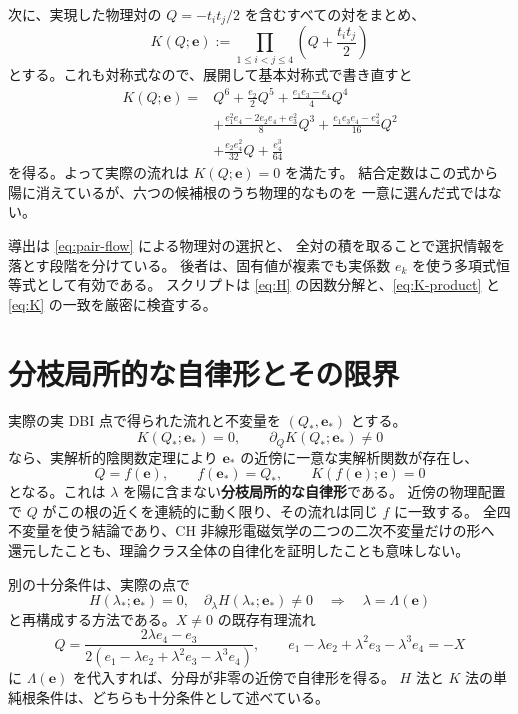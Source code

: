 \documentclass[11pt,a4paper]{article}
\newcommand{\ee}{\boldsymbol e}
\begin{document}
次に、実現した物理対の $Q=-t_it_j/2$ を含むすべての対をまとめ、
\begin{equation}\label{eq:K-product}
K(Q;\ee):=\prod_{1\leq i<j\leq4}\left(Q+\frac{t_it_j}{2}\right)
\end{equation}
とする。これも対称式なので、展開して基本対称式で書き直すと
\begin{equation}\label{eq:K}
\boxed{\begin{aligned}
K(Q;\ee)={}&Q^6+\frac{e_2}{2}Q^5+\frac{e_1e_3-e_4}{4}Q^4\\
&+\frac{e_1^2e_4-2e_2e_4+e_3^2}{8}Q^3
 +\frac{e_1e_3e_4-e_4^2}{16}Q^2\\
&+\frac{e_2e_4^2}{32}Q+\frac{e_4^3}{64}
\end{aligned}}
\end{equation}
を得る。よって実際の流れは $K(Q;\ee)=0$ を満たす。
結合定数はこの式から陽に消えているが、六つの候補根のうち物理的なものを
一意に選んだ式ではない。

導出は \eqref{eq:pair-flow} による物理対の選択と、
全対の積を取ることで選択情報を落とす段階を分けている。
後者は、固有値が複素でも実係数 $e_k$ を使う多項式恒等式として有効である。
スクリプトは \eqref{eq:H} の因数分解と、\eqref{eq:K-product} と
\eqref{eq:K} の一致を厳密に検査する。

\newpage
\section{分枝局所的な自律形とその限界}
実際の実 DBI 点で得られた流れと不変量を $(Q_*,\ee_*)$ とする。
\begin{equation}\label{eq:IFT-condition}
K(Q_*;\ee_*)=0,\qquad \partial_QK(Q_*;\ee_*)\ne0
\end{equation}
なら、実解析的陰関数定理により $\ee_*$ の近傍に一意な実解析関数が存在し、
\begin{equation}\label{eq:autonomy}
Q=f(\ee),\qquad f(\ee_*)=Q_*,\qquad K(f(\ee);\ee)=0
\end{equation}
となる。これは $\lambda$ を陽に含まない\textbf{分枝局所的な自律形}である。
近傍の物理配置で $Q$ がこの根の近くを連続的に動く限り、その流れは同じ $f$ に一致する。
全四不変量を使う結論であり、CH 非線形電磁気学の二つの二次不変量だけの形へ
還元したことも、理論クラス全体の自律化を証明したことも意味しない。

別の十分条件は、実際の点で
\begin{equation}\label{eq:H-IFT}
H(\lambda_*;\ee_*)=0,\quad \partial_\lambda H(\lambda_*;\ee_*)\ne0
\quad\Longrightarrow\quad \lambda=\Lambda(\ee)
\end{equation}
と再構成する方法である。$X\ne0$ の既存有理流れ
\begin{equation}\label{eq:old-flow}
Q=\frac{2\lambda e_4-e_3}
 {2(e_1-\lambda e_2+\lambda^2e_3-\lambda^3e_4)},\qquad
 e_1-\lambda e_2+\lambda^2e_3-\lambda^3e_4=-X
\end{equation}
に $\Lambda(\ee)$ を代入すれば、分母が非零の近傍で自律形を得る。
$H$ 法と $K$ 法の単純根条件は、どちらも十分条件として述べている。
\end{document}
